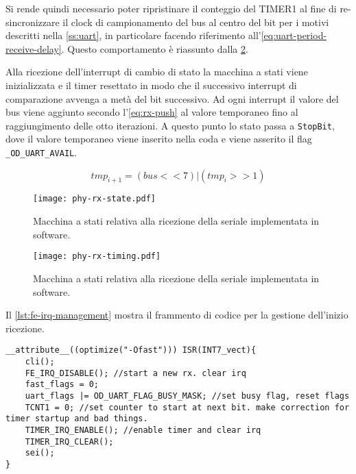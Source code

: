 Si rende quindi necessario poter ripristinare il conteggio del TIMER1 al fine di re-sincronizzare il clock di campionamento del bus al centro del bit per i motivi descritti nella \cref{ss:uart}, in particolare facendo riferimento all'\cref{eq:uart-period-receive-delay}. Questo comportamento è riassunto dalla \cref{fig:phy-rx-timing}.

Alla ricezione dell'interrupt di cambio di stato la macchina a stati viene inizializzata e il timer resettato in modo che il successivo interrupt di comparazione avvenga a metà del bit successivo. Ad ogni interrupt il valore del bus viene aggiunto secondo l'\cref{eq:rx-push} al valore temporaneo fino al raggiungimento delle otto iterazioni. A questo punto lo stato passa a \texttt{StopBit}, dove il valore temporaneo viene inserito nella coda e viene asserito il flag \texttt{\_OD\_UART\_AVAIL}.

\begin{equation}\label{eq:rx-push}
    tmp_{i+1} = (bus << 7) | (tmp_i >> 1)
\end{equation}

\begin{figure}[p]
    \centering
    \texttt{[image: phy-rx-state.pdf]}
    \caption[]{Macchina a stati relativa alla ricezione della seriale implementata in software.}\label{fig:phy-rx-state}
\end{figure}

\begin{figure}[p]
    \centering
    \texttt{[image: phy-rx-timing.pdf]}
    \caption[]{Macchina a stati relativa alla ricezione della seriale implementata in software.}\label{fig:phy-rx-timing}
\end{figure}

Il \cref{lst:fe-irq-management} mostra il frammento di codice per la gestione dell'inizio ricezione. 

\noindent\begin{minipage}{\textwidth}
    \begin{lstlisting}[style=C, caption={IRQ di gestione inizio trasmissione}, label=lst:fe-irq-management]
__attribute__((optimize("-Ofast"))) ISR(INT7_vect){
    cli();
    FE_IRQ_DISABLE(); //start a new rx. clear irq
    fast_flags = 0;
    uart_flags |= OD_UART_FLAG_BUSY_MASK; //set busy flag, reset flags
    TCNT1 = 0; //set counter to start at next bit. make correction for timer startup and bad things.
    TIMER_IRQ_ENABLE(); //enable timer and clear irq
    TIMER_IRQ_CLEAR();
    sei();
}
    \end{lstlisting}
\end{minipage}

